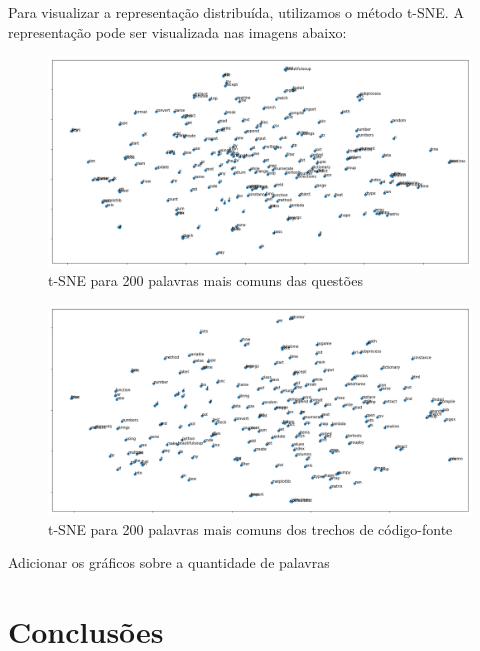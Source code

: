 \documentclass[12pt]{article}
\begin{document}
Para visualizar a representação distribuída, utilizamos o método t-SNE. A representação pode ser visualizada nas imagens abaixo:

\begin{figure}[h]
\includegraphics[width=14cm]{figures/tsne-question.png}
\caption{t-SNE para 200 palavras mais comuns das questões}
\label{fig:tsne-questao}
\end{figure}

\begin{figure}[h]
\includegraphics[width=14cm]{figures/tsne-code.png}
\caption{t-SNE para 200 palavras mais comuns dos trechos de código-fonte}
\label{fig:tsne-codigo}
\end{figure}

Adicionar os gráficos sobre a quantidade de palavras


\section{Conclusões}



\end{document}
